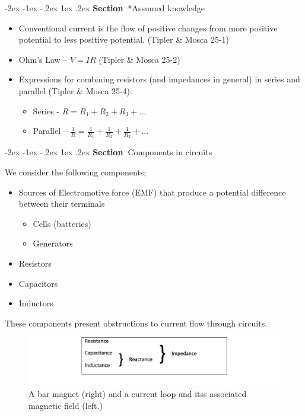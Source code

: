 \documentclass[
]{book}
\makeatletter
\renewcommand\section{%
\@startsection{section}{1}{\z@}%
              {-2ex \@plus -1ex \@minus -.2ex}%
              {1ex \@plus .2ex}%
              {\sffamily\bfseries\large\noindent Section~}}
\numberwithin{equation}{section}
\makeatother
\begin{document}
\hypertarget{assumed-knowledge}{%
\section*{Assumed knowledge}\label{assumed-knowledge}}

\begin{itemize}
\item
  Conventional current is the flow of positive changes from more
  positive potential to less positive potential. (Tipler \& Mosca 25-1)
\item
  Ohm's Law -- \(V = IR\) (Tipler \& Mosca 25-2)
\item
  Expressions for combining resistors (and impedances in general) in
  series and parallel (Tipler \& Mosca 25-4):

  \begin{itemize}
  \item
    Series - \(R = R_1 + R_2+ R_3 + ...\)
  \item
    Parallel --
    \(\frac{1}{R} = \frac{1}{R_1} + \frac{1}{R_2} + \frac{1}{R_3} + ...\)
  \end{itemize}
\end{itemize}

\hypertarget{components-in-circuits}{%
\section{Components in circuits}\label{components-in-circuits}}

We consider the following components;

\begin{itemize}
\item
  Sources of Electromotive force (EMF) that produce a potential
  difference between their terminals

  \begin{itemize}
  \item
    Cells (batteries)
  \item
    Generators
  \end{itemize}
\item
  Resistors
\item
  Capacitors
\item
  Inductors
\end{itemize}

These components present obstructions to current flow through circuits.

\begin{figure}

{\centering \includegraphics[width=0.7\linewidth]{Figures/ances_summary} 

}

\caption{A bar magnet (right) and a current loop and itss associated magnetic field (left.)}\label{fig:ancesSummary}
\end{figure}
\end{document}

